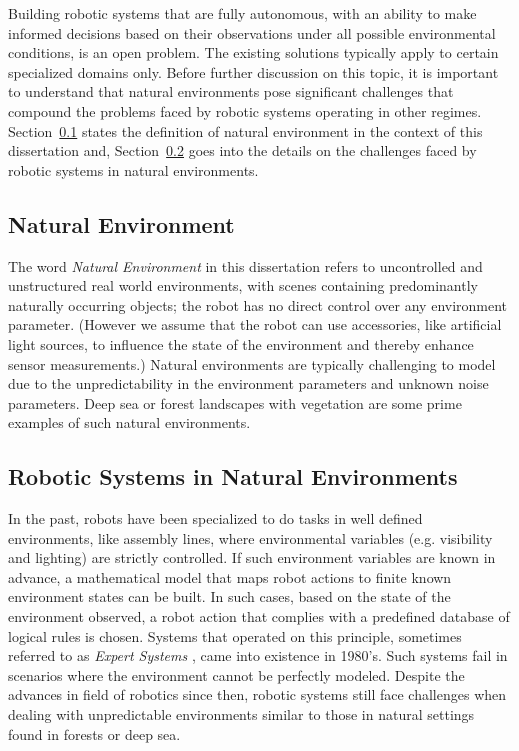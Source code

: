 Building robotic systems that are fully autonomous, with an ability to make informed decisions based on their observations under all possible environmental conditions, is an open problem.
The existing solutions typically apply to certain specialized domains only. 
Before further discussion on this topic, it is important to
understand that natural environments pose significant challenges that compound the problems faced by robotic systems operating in other regimes.
Section~\ref{sec:nat_environ_def} states the definition of natural environment in the context of this dissertation and, Section~\ref{sec:robots_nat_environ} goes into the details on the challenges faced by robotic systems in natural environments.


\subsection{Natural Environment}
\label{sec:nat_environ_def}

The word \emph{Natural Environment} in this dissertation refers to uncontrolled and unstructured real world environments, with scenes containing predominantly naturally occurring objects; the robot has 
no direct control over any environment parameter. (However we assume that the robot can use accessories, like artificial light sources, to influence the state of the environment and thereby enhance sensor measurements.) 
Natural environments are typically challenging to model due to the unpredictability in the environment parameters and unknown noise parameters. 
Deep sea or forest landscapes with vegetation are some prime examples of such natural environments.


\subsection{Robotic Systems in Natural Environments}
\label{sec:robots_nat_environ}

In the past, robots have been specialized to do tasks in well defined environments, like assembly lines, where environmental variables (e.g. visibility and lighting) are strictly controlled. If such environment variables are known in advance, a mathematical model that maps robot actions to finite known environment states can be built. In such cases, based on the state of the environment observed, a robot action that complies with a predefined database of logical rules is chosen. Systems that operated on this principle, sometimes referred to as \emph{Expert Systems} 
\cite{russel}, came into existence in 1980's. Such systems fail in scenarios where the environment cannot be perfectly modeled. Despite the advances in field of robotics since then, robotic systems still face challenges when dealing with unpredictable environments similar to those in natural settings found in forests or deep sea.


